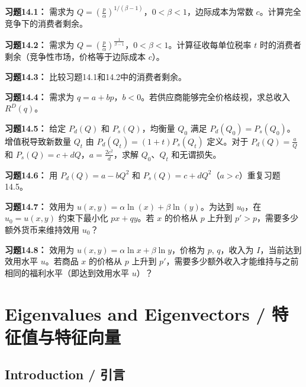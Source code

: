 \begin{translation}
\textbf{习题14.1：} 需求为 $Q = \left(\frac{p}{\alpha}\right)^{1/(\beta-1)}$，$0 < \beta < 1$，边际成本为常数 $c$。计算完全竞争下的消费者剩余。

\textbf{习题14.2：} 需求为 $Q = \left(\frac{p}{\alpha}\right)^{\frac{1}{\beta-1}}$，$0 < \beta < 1$。计算征收每单位税率 $t$ 时的消费者剩余（竞争性市场，价格等于边际成本 $c$）。

\textbf{习题14.3：} 比较习题14.1和14.2中的消费者剩余。

\textbf{习题14.4：} 需求为 $q = a + bp$，$b < 0$。若供应商能够完全价格歧视，求总收入 $R^D(q)$。

\textbf{习题14.5：} 给定 $P_d(Q)$ 和 $P_s(Q)$，均衡量 $Q_0$ 满足 $P_d(Q_0) = P_s(Q_0)$。增值税导致新数量 $Q_t$ 由 $P_d(Q_t) = (1+t)P_s(Q_t)$ 定义。对于 $P_d(Q) = \frac{a}{Q}$ 和 $P_s(Q) = c + dQ$，$a = \frac{2c^2}{d}$，求解 $Q_0$、$Q_t$ 和无谓损失。

\textbf{习题14.6：} 用 $P_d(Q) = a - bQ^2$ 和 $P_s(Q) = c + dQ^2$（$a > c$）重复习题14.5。

\textbf{习题14.7：} 效用为 $u(x, y) = \alpha \ln(x) + \beta \ln(y)$。为达到 $u_0$，在 $u_0 = u(x, y)$ 约束下最小化 $px + qy$。若 $x$ 的价格从 $p$ 上升到 $p' > p$，需要多少额外货币来维持效用 $u_0$？

\textbf{习题14.8：} 效用为 $u(x, y) = \alpha \ln x + \beta \ln y$，价格为 $p$, $q$，收入为 $I$，当前达到效用水平 $u$。若商品 $x$ 的价格从 $p$ 上升到 $p'$，需要多少额外收入才能维持与之前相同的福利水平（即达到效用水平 $u$）？
\end{translation}

\setcounter{chapter}{14}

\chapter{Eigenvalues and Eigenvectors / 特征值与特征向量}

\section{Introduction / 引言}

